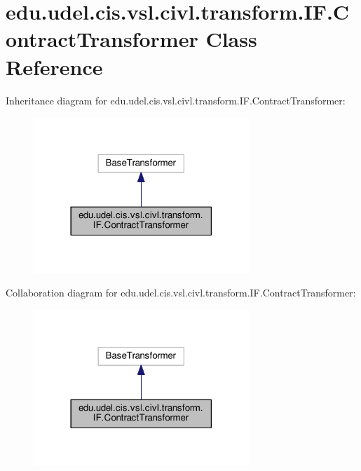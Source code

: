 \hypertarget{classedu_1_1udel_1_1cis_1_1vsl_1_1civl_1_1transform_1_1IF_1_1ContractTransformer}{}\section{edu.\+udel.\+cis.\+vsl.\+civl.\+transform.\+I\+F.\+Contract\+Transformer Class Reference}
\label{classedu_1_1udel_1_1cis_1_1vsl_1_1civl_1_1transform_1_1IF_1_1ContractTransformer}


Inheritance diagram for edu.\+udel.\+cis.\+vsl.\+civl.\+transform.\+I\+F.\+Contract\+Transformer\+:
\nopagebreak
\begin{figure}[H]
\begin{center}
\leavevmode
\includegraphics[width=230pt]{classedu_1_1udel_1_1cis_1_1vsl_1_1civl_1_1transform_1_1IF_1_1ContractTransformer__inherit__graph}
\end{center}
\end{figure}


Collaboration diagram for edu.\+udel.\+cis.\+vsl.\+civl.\+transform.\+I\+F.\+Contract\+Transformer\+:
\nopagebreak
\begin{figure}[H]
\begin{center}
\leavevmode
\includegraphics[width=230pt]{classedu_1_1udel_1_1cis_1_1vsl_1_1civl_1_1transform_1_1IF_1_1ContractTransformer__coll__graph}
\end{center}
\end{figure}
